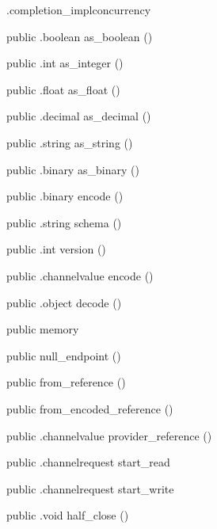 \begin{CrexxClass}{.completion\_impl}{concurrency}
\begin{Members}
    \Method
      {public}
      {.boolean}
      {as\_boolean}
      {()}

    \Method
      {public}
      {.int}
      {as\_integer}
      {()}

    \Method
      {public}
      {.float}
      {as\_float}
      {()}

    \Method
      {public}
      {.decimal}
      {as\_decimal}
      {()}

    \Method
      {public}
      {.string}
      {as\_string}
      {()}

    \Method
      {public}
      {.binary}
      {as\_binary}
      {()}

    \Method
      {public}
      {.binary}
      {encode}
      {()}

    \Method
      {public}
      {.string}
      {schema}
      {()}

    \Method
      {public}
      {.int}
      {version}
      {()}

    \Method
      {public}
      {.channelvalue}
      {encode}
      {()}

    \Method
      {public}
      {.object}
      {decode}
      {()}

    \Factory
      {public}
      {memory}
      {}

    \Factory
      {public}
      {null\_endpoint}
      {()}

    \Factory
      {public}
      {from\_reference}
      {()}

    \Factory
      {public}
      {from\_encoded\_reference}
      {()}

    \Method
      {public}
      {.channelvalue}
      {provider\_reference}
      {()}

    \Method
      {public}
      {.channelrequest}
      {start\_read}
      {}

    \Method
      {public}
      {.channelrequest}
      {start\_write}
      {}

    \Method
      {public}
      {.void}
      {half\_close}
      {()}


\end{Members}
\end{CrexxClass}
